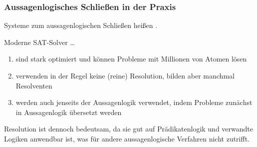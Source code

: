 \documentclass[aspectratio=1610,onlymath]{beamer}
\begin{document}
\begin{frame}\frametitle{Aussagenlogisches Schließen in der Praxis}

Systeme zum aussagenlogischen Schließen heißen .
\bigskip

Moderne SAT-Solver \ldots
\begin{enumerate}[$\ldots$]
\item sind \alert{stark optimiert} und können Probleme mit Millionen von Atomen lösen
\item verwenden in der Regel \alert{keine (reine) Resolution}, bilden aber manchmal Resolventen
\item werden auch \alert{jenseits der Aussagenlogik} verwendet, indem Probleme zunächst in Aussagenlogik übersetzt werden
\end{enumerate}\bigskip

Resolution ist dennoch bedeutsam, da sie gut auf Prädikatenlogik und verwandte Logiken anwendbar ist, was für andere aussagenlogische Verfahren nicht zutrifft.

\end{frame}
\end{document}
